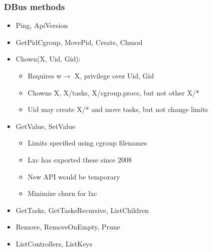 \documentclass{beamer}
\begin{document}
\begin{frame}
\frametitle{DBus methods}
\begin{itemize}
\item Ping, ApiVersion
\item GetPidCgroup, MovePid, Create, Chmod
\item Chown(X, Uid, Gid):
	\begin{itemize}
	\item Requires w$\rightarrow$ X, privilege over Uid, Gid
	\item Chowns X, X/tasks, X/cgroup.procs, but not other X/*
	\item Uid may create X/* and move tasks, but not change limits
	\end{itemize}
\item GetValue, SetValue
	\begin{itemize}
	\item Limits specified using cgroup filenames
	\item Lxc has exported these since 2008
	\item New API would be temporary
	\item Minimize churn for lxc
	\end{itemize}
\item GetTasks, GetTasksRecursive, ListChildren
\item Remove, RemoveOnEmpty, Prune
\item ListControllers, ListKeys
\end{itemize}
\end{frame}
\end{document}
